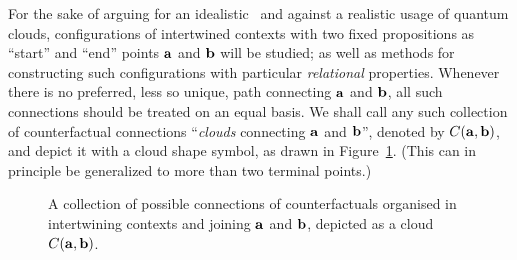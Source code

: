 \documentclass[%
  reprint,
  twocolumn,
 showpacs,
 showkeys,
 preprintnumbers,
 amsmath,amssymb,
 aps,
  prl,
  longbibliography,
 ]{revtex4-1}
\begin{document}
For the sake of arguing for an idealistic~\cite{berkeley,stace,Goldschmidt2017-idealism} and against a realistic usage of quantum clouds,
configurations of intertwined contexts with two fixed propositions
as ``start'' and ``end'' points ${\bf a}$ and ${\bf b}$ will be studied;
as well as methods for constructing such configurations with particular {\em relational} properties.
Whenever there is no preferred, less so unique, path connecting  ${\bf a}$ and ${\bf b}$, all such connections should be treated on an equal basis.
We shall call any such collection of counterfactual connections ``{\em clouds} connecting ${\bf a}$ and ${\bf b}$'',
denoted by $C({\bf a},{\bf b})$, and depict it with a cloud shape symbol,
as drawn in Figure~\ref{2018-c-fcloud}. (This can in principle be generalized to more than two terminal points.)
\begin{figure}
\begin{center}
\end{center}
\caption{
\label{2018-c-fcloud}
A collection of possible connections of counterfactuals organised in intertwining contexts and joining ${\bf a}$ and ${\bf b}$, depicted as a cloud
$C({\bf a},{\bf b})$.}
\end{figure}
\end{document}
